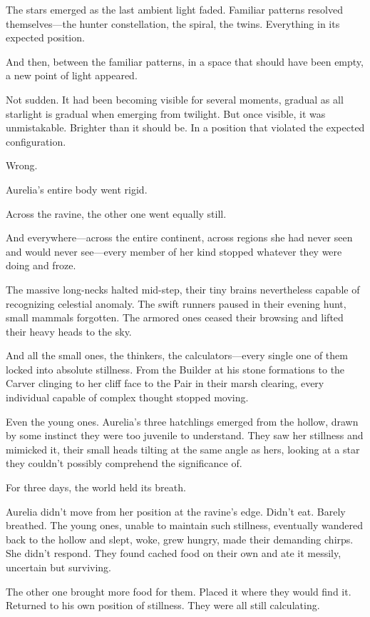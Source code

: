 The stars emerged as the last ambient light faded. Familiar patterns resolved themselves—the hunter constellation, the spiral, the twins. Everything in its expected position.

And then, between the familiar patterns, in a space that should have been empty, a new point of light appeared.

Not sudden. It had been becoming visible for several moments, gradual as all starlight is gradual when emerging from twilight. But once visible, it was unmistakable. Brighter than it should be. In a position that violated the expected configuration.

Wrong.

Aurelia's entire body went rigid.

Across the ravine, the other one went equally still.

And everywhere—across the entire continent, across regions she had never seen and would never see—every member of her kind stopped whatever they were doing and froze.

The massive long-necks halted mid-step, their tiny brains nevertheless capable of recognizing celestial anomaly. The swift runners paused in their evening hunt, small mammals forgotten. The armored ones ceased their browsing and lifted their heavy heads to the sky.

And all the small ones, the thinkers, the calculators—every single one of them locked into absolute stillness. From the Builder at his stone formations to the Carver clinging to her cliff face to the Pair in their marsh clearing, every individual capable of complex thought stopped moving.

Even the young ones. Aurelia's three hatchlings emerged from the hollow, drawn by some instinct they were too juvenile to understand. They saw her stillness and mimicked it, their small heads tilting at the same angle as hers, looking at a star they couldn't possibly comprehend the significance of.

For three days, the world held its breath.

\scenebreak

Aurelia didn't move from her position at the ravine's edge. Didn't eat. Barely breathed. The young ones, unable to maintain such stillness, eventually wandered back to the hollow and slept, woke, grew hungry, made their demanding chirps. She didn't respond. They found cached food on their own and ate it messily, uncertain but surviving.

The other one brought more food for them. Placed it where they would find it. Returned to his own position of stillness. They were all still calculating.

